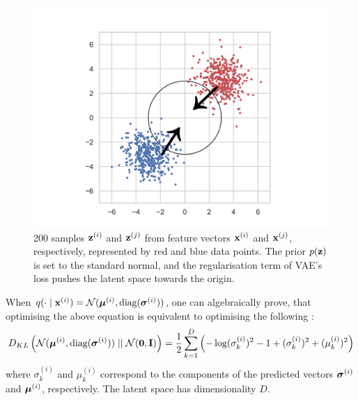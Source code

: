 	\begin{figure}
		\centering
		\includegraphics[width=0.7\linewidth]{two_gaussian_distributions}
		\caption{200 samples $\mathbf{z}^{(i)}$ and $\mathbf{z}^{(j)}$ from feature vectors $\mathbf{x}^{(i)}$ and $\mathbf{x}^{(j)}$, respectively, represented by red and blue data points. The prior $p(\mathbf{z})$ is set to the standard normal, and the regularisation term of VAE's loss pushes the latent space towards the origin.}
		\label{fig:twogaussiandistributions}
	\end{figure}
	When $q (\cdot \mid \mathbf{x}^{(i)}) = \mathcal{N}(\bm{\mu}^{(i)}, \text{diag}(\bm{\sigma}^{(i)}))$, one can algebraically prove, that optimising the above equation is equivalent to optimising the following \cite{kingmaAutoEncodingVariationalBayes2022}: 
	\begin{equation}	
		D_{KL} \left( \mathcal{N}(\bm{\mu}^{(i)}, \text{diag}(\bm{\sigma}^{(i)})) \mid \mid \mathcal{N}(\bm{\mathbf{0}}, \mathbf{I}) \right) = \frac{1}{2} \sum_{k=1}^{D} \left( -\log (\sigma_k^{(i)})^2 - 1 + (\sigma_k^{(i)})^2 + (\mu_k^{(i)})^2 \right)
	\end{equation}
	where $\sigma_k^{(i)}$ and $\mu_k^{(i)}$ correspond to the components of the predicted vectors $\bm{\sigma}^{(i)}$ and $\bm{\mu}^{(i)}$, respectively. The latent space has dimensionality $D$.
	




